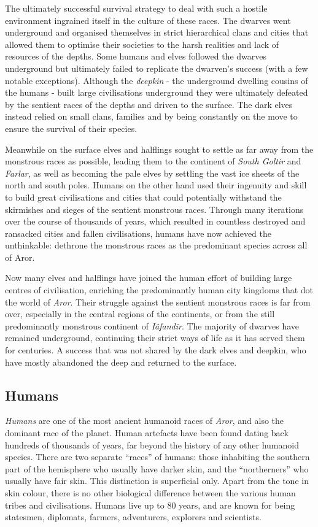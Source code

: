 The ultimately successful survival strategy to deal with such a hostile
environment ingrained itself in the culture of these races. The dwarves went
underground and organised themselves in strict hierarchical clans and cities
that allowed them to optimise their societies to the harsh realities and lack
of resources of the depths. Some humans and elves followed the dwarves
underground but ultimately failed to replicate the dwarven's success (with a
few notable exceptions). Although the \emph{deepkin} - the underground
dwelling cousins of the humans - built large civilisations underground they
were ultimately defeated by the sentient races of the depths and driven to the
surface. The dark elves instead relied on small clans, families and by being
constantly on the move to ensure the survival of their species.

Meanwhile on the surface elves and halflings sought to settle as far away from
the monstrous races as possible, leading them to the continent of \emph{South
Goltir} and \emph{Farlar}, as well as becoming the pale elves by settling the
vast ice sheets of the north and south poles. Humans on the other hand used
their ingenuity and skill to build great civilisations and cities that could
potentially withstand the skirmishes and sieges of the sentient monstrous
races. Through many iterations over the course of thousands of years, which
resulted in countless destroyed and ransacked cities and fallen civilisations,
humans have now achieved the unthinkable: dethrone the monstrous races as the
predominant species across all of Aror.

Now many elves and halflings have joined the human effort of building large
centres of civilisation, enriching the predominantly human city kingdoms that
dot the world of \emph{Aror}. Their struggle against the sentient monstrous
races is far from over, especially in the central regions of the continents,
or from the still predominantly monstrous continent of \emph{Iâfandir}. The
majority of dwarves have remained underground, continuing their strict ways of
life as it has served them for centuries. A success that was not shared by the
dark elves and deepkin, who have mostly abandoned the deep and returned to the
surface.

\subsection{Humans}
\label{sec:Humans}

\emph{Humans} are one of the most ancient humanoid races of \emph{Aror}, and
also the dominant race of the planet. Human artefacts have been found dating
back hundreds of thousands of years, far beyond the history of any other
humanoid species. There are two separate ``races'' of humans: those inhabiting
the southern part of the hemisphere who usually have darker skin, and the
``northerners'' who usually have fair skin. This distinction is superficial
only. Apart from the tone in skin colour, there is no other biological
difference between the various human tribes and civilisations. Humans live up
to 80 years, and are known for being statesmen, diplomats, farmers,
adventurers, explorers and scientists.

